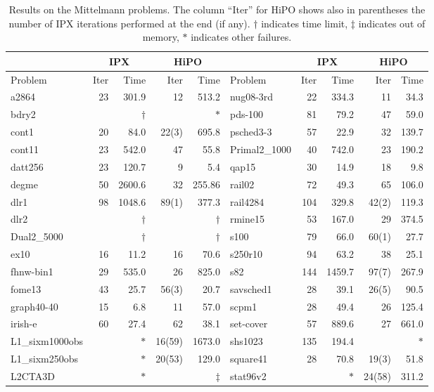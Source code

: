 \documentclass[a4paper]{article}
\newcommand{\0}{\mathbf 0}
\begin{document}
\begin{table}
\tiny
\caption{Results on the Mittelmann problems. The column ``Iter'' for HiPO shows also in parentheses the number of IPX iterations performed at the end (if any). $\dagger$ indicates time limit, $\ddagger$ indicates out of memory, $\ast$ indicates other failures.}
\label{tab:mittelmann_results}
\centering
\begin{tabular}{l|rr|rr||l|rr|rr}
\toprule
& \multicolumn{2}{c|}{IPX} & \multicolumn{2}{c||}{HiPO} & & \multicolumn{2}{c|}{IPX} & \multicolumn{2}{c}{HiPO} \\
\midrule
Problem & Iter & Time & Iter & Time & Problem & Iter & Time & Iter & Time\\
\midrule
a2864 & 23 & 301.9 & 12 & 513.2 & nug08-3rd & 22 & 334.3 & 11 & 34.3 \\
bdry2 &  & $\dagger$ &  & $\ast$ & pds-100 & 81 & 79.2 & 47 & 59.0 \\
cont1 & 20 & 84.0 & 22(3) & 695.8 & psched3-3 & 57 & 22.9 & 32 & 139.7 \\
cont11 & 23 & 542.0 & 47 & 55.8 & Primal2\_1000 & 40 & 742.0 & 23 & 190.2 \\
datt256 & 23 & 120.7 & 9 & 5.4 & qap15 & 30 & 14.9 & 18 & 9.8 \\
degme & 50 & 2600.6 & 32 & 255.86 & rail02 & 72 & 49.3 & 65 & 106.0 \\
dlr1 & 98 & 1048.6 & 89(1) & 377.3 & rail4284 & 104 & 329.8 & 42(2) & 119.3 \\
dlr2 &  & $\dagger$ &  & $\dagger$ & rmine15 & 53 & 167.0 & 29 & 374.5 \\
Dual2\_5000 &  & $\dagger$ &  & $\dagger$ & s100 & 79 & 66.0 & 60(1) & 27.7 \\
ex10 & 16 & 11.2 & 16 & 70.6 & s250r10 & 94 & 63.2 & 38 & 25.1 \\
fhnw-bin1 & 29 & 535.0 & 26 & 825.0 & s82 & 144 & 1459.7 & 97(7) & 267.9 \\
fome13 & 43 & 25.7 & 56(3) & 20.7 & savsched1 & 28 & 39.1 & 26(5) & 90.5 \\
graph40-40 & 15 & 6.8 & 11 & 57.0 & scpm1 & 28 & 49.4 & 26 & 125.4 \\
irish-e & 60 & 27.4 & 62 & 38.1 & set-cover & 57 & 889.6 & 27 & 661.0 \\
L1\_sixm1000obs &  & $\ast$ & 16(59) & 1673.0 & shs1023 & 135 & 194.4 &  & $\ast$ \\
L1\_sixm250obs &  & $\ast$ & 20(53) & 129.0 & square41 & 28 & 70.8 & 19(3) & 51.8 \\
L2CTA3D &  & $\ast$ &  & $\ddagger$ & stat96v2 &  & $\ast$ & 24(58) & 311.2 \\

\end{tabular}
\end{table}
\end{document}
